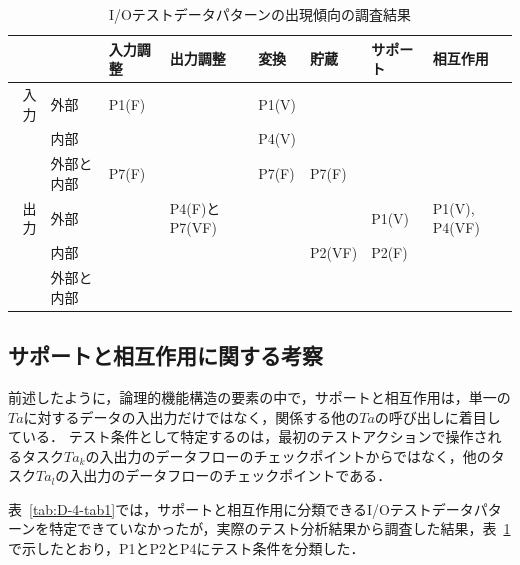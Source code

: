 \begin{table}[htbp]
  \centering
  \caption{I/Oテストデータパターンの出現傾向の調査結果}
    \begin{tabular}{|r|p{4em}|p{4em}|p{4em}|p{3em}|p{3em}|p{4em}|p{4em}|}
    \hline
          & \multicolumn{1}{l|}{} & \multicolumn{1}{p{4em}|}{入力調整} & \multicolumn{1}{p{4em}|}{出力調整} & \multicolumn{1}{p{4em}|}{変換} & \multicolumn{1}{p{4em}|}{貯蔵} & \multicolumn{1}{p{2em}|}{サポート} & \multicolumn{1}{p{2em}|}{相互作用} \bigstrut\\
    \hline
    \multicolumn{1}{|p{1.5em}|}{入力} & 外部 & P1(F) &       & P1(V) &       &       &  \bigstrut\\
\cline{2-8}          & 内部 &       &       & P4(V) &       &       &  \bigstrut\\
\cline{2-8}          & 外部と内部 & \multicolumn{1}{p{4em}|}{P7(F)} &       & \multicolumn{1}{p{4em}|}{P7(F)} & \multicolumn{1}{p{4em}|}{P7(F)} &       &  \bigstrut\\
    \hline
    \multicolumn{1}{|p{2em}|}{出力} & 外部 &       & P4(F)とP7(VF) &       &       & P1(V) & \multicolumn{1}{|p{3em}|}{P1(V), P4(VF)} \bigstrut\\
\cline{2-8}          & 内部 &       &       &       & \multicolumn{1}{p{4em}|}{P2(VF)} & P2(F) &  \bigstrut\\
\cline{2-8}\cline{8-8}          & 外部と内部 &       &       &       &       &       &  \bigstrut\\
    \hline
    \end{tabular}%
  \label{tab:ioresult}%
\end{table}%

\subsection{サポートと相互作用に関する考察}
前述したように，論理的機能構造の要素の中で，サポートと相互作用は，単一の$Ta$に対するデータの入出力だけではなく，関係する他の$Ta$の呼び出しに着目している．
テスト条件として特定するのは，最初のテストアクションで操作されるタスク$Ta_k$の入出力のデータフローのチェックポイントからではなく，他のタスク$Ta_l$の入出力のデータフローのチェックポイントである．

表~\ref{tab:D-4-tab1}では，サポートと相互作用に分類できるI/Oテストデータパターンを特定できていなかったが，実際のテスト分析結果から調査した結果，表~\ref{tab:ioresult}で示したとおり，P1とP2とP4にテスト条件を分類した．

